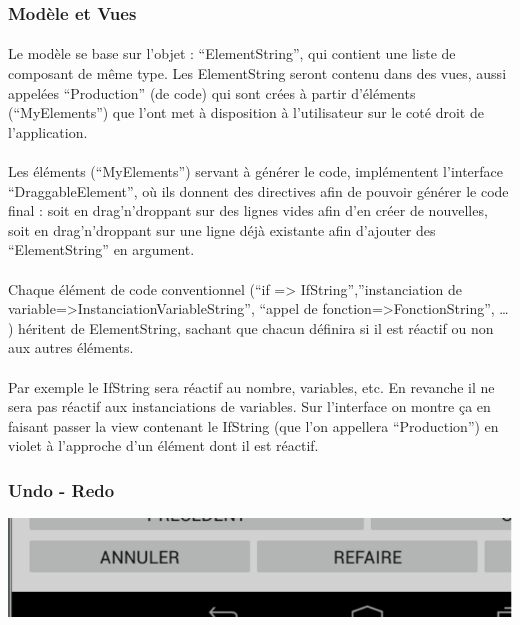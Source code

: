 \documentclass[a4paper]{article}
\begin{document}
\subsubsection{Modèle et Vues}

\paragraph{}
Le modèle se base sur l’objet : “ElementString”, qui contient une liste de composant de même type. Les ElementString seront contenu dans des vues, aussi appelées “Production” (de code) qui sont crées à partir d’éléments (“MyElements”) que l’ont met à disposition à l’utilisateur sur le coté droit de l’application.

\paragraph{}
Les éléments (“MyElements”) servant à générer le code, implémentent l’interface “DraggableElement”, où ils donnent des directives afin de pouvoir générer le code final : 
soit en drag'n'droppant sur des lignes vides afin d’en créer de nouvelles, soit en drag'n'droppant sur une ligne déjà existante afin d’ajouter des “ElementString” en argument.

\paragraph{}
Chaque élément de code conventionnel (“if => IfString”,”instanciation de variable=>InstanciationVariableString”, “appel de fonction=>FonctionString”, … ) héritent de ElementString, sachant que chacun définira si il est réactif ou non aux autres éléments. 

\paragraph{}
Par exemple le IfString sera réactif au nombre, variables, etc. En revanche il ne sera pas réactif aux instanciations de variables. Sur l’interface on montre ça en faisant passer la view contenant le IfString (que l’on appellera “Production”) en violet à l’approche d’un élément dont il est réactif.

\subsubsection{Undo - Redo}

\begin{center}
\includegraphics[scale=0.5]{img/undo.png}
\end{center}
\end{document}

